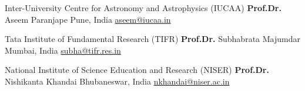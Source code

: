


\begin{cventries}


\cventry
{Inter-University Centre for Astronomy and Astrophysics (IUCAA)} %
{\textbf{  Prof.Dr.} Aseem Paranjape} %
{Pune, India} %
{\href{mailto:aseem@iucaa.in}{aseem@iucaa.in}} %
{}


\cventry
{Tata Institute of Fundamental Research (TIFR)} %
{\textbf{  Prof.Dr.} Subhabrata Majumdar} %
{Mumbai, India} %
{\href{mailto:subha@tifr.res.in}{subha@tifr.res.in}} %
{}



\cventry
{National Institute of Science Education and Research (NISER)} %
{\textbf{  Prof.Dr.} Nishikanta Khandai} %
{Bhubaneswar, India} %
{\href{mailto:nkhandai@niser.ac.in}{nkhandai@niser.ac.in}} %
{}






\end{cventries}
